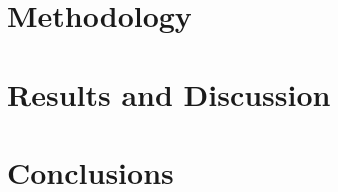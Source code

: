 \documentclass[12pt, twoside]{book}
\begin{document}
%

\chapter{Methodology}
\label{chap:methods}


\chapter{Results and Discussion}
\label{chap:results}



%


\chapter{Conclusions}
\label{chap:conclusions}





 
 

\appendix  
\clearpage %
\addappheadtotoc 
\appendixpage 


\end{document}
